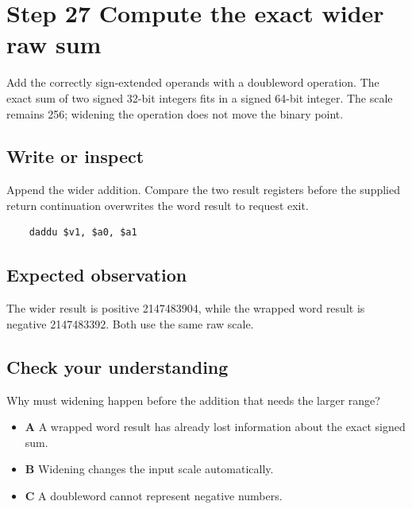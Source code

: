 \section{Step 27 Compute the exact wider raw sum}\label{ball-s27}

Add the correctly sign-extended operands with a doubleword operation. The exact sum of two signed 32-bit integers fits in a signed 64-bit integer. The scale remains 256; widening the operation does not move the binary point.

\subsection{Write or inspect}
Append the wider addition. Compare the two result registers before the supplied return continuation overwrites the word result to request exit.

\begin{verbatim}
    daddu $v1, $a0, $a1
\end{verbatim}

\subsection{Expected observation}
The wider result is positive 2147483904, while the wrapped word result is negative 2147483392. Both use the same raw scale.

\subsection{Check your understanding}
Why must widening happen before the addition that needs the larger range?

\begin{itemize}
  \item \textbf{A} A wrapped word result has already lost information about the exact signed sum.
  \item \textbf{B} Widening changes the input scale automatically.
  \item \textbf{C} A doubleword cannot represent negative numbers.
\end{itemize}
